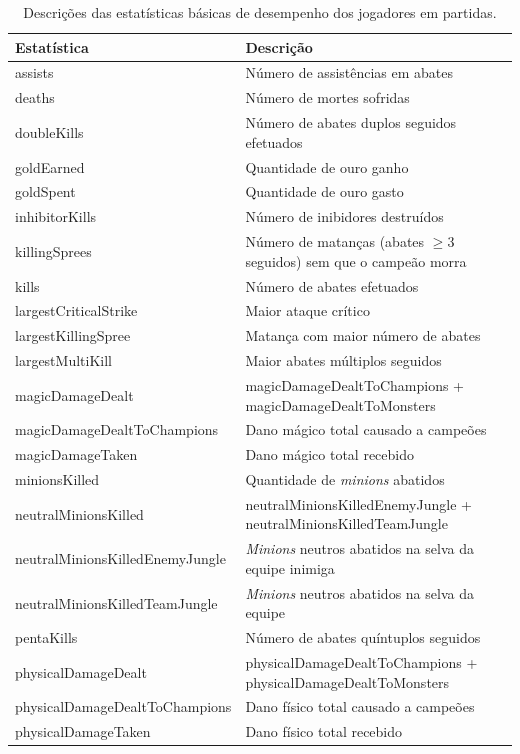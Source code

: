 \begin{table}
  \scriptsize
  \caption{Descrições das estatísticas básicas de desempenho dos jogadores em partidas.}
  \label{tab:features-desc}
  \begin{tabular}{p{}p{}}
    \toprule
    Estatística & Descrição \\
    \midrule
assists & Número de assistências em abates\\
deaths & Número de mortes sofridas \\
doubleKills & Número de abates duplos seguidos efetuados\\
goldEarned & Quantidade de ouro ganho\\
goldSpent & Quantidade de ouro gasto\\
inhibitorKills & Número de inibidores destruídos\\
killingSprees & Número de matanças (abates $\geq 3$ seguidos) sem que o campeão morra \\
kills & Número de abates efetuados\\
largestCriticalStrike & Maior ataque crítico\\
largestKillingSpree & Matança com maior número de abates\\
largestMultiKill & Maior abates múltiplos seguidos\\
magicDamageDealt & magicDamageDealtToChampions +  magicDamageDealtToMonsters\\
magicDamageDealtToChampions & Dano mágico total causado a campeões\\
magicDamageTaken & Dano mágico total recebido\\
minionsKilled & Quantidade de \textit{minions} abatidos\\
neutralMinionsKilled & neutralMinionsKilledEnemyJungle + neutralMinionsKilledTeamJungle\\
neutralMinionsKilledEnemyJungle & \textit{Minions} neutros abatidos na selva da equipe inimiga\\
neutralMinionsKilledTeamJungle & \textit{Minions} neutros abatidos na selva da equipe\\
pentaKills & Número de abates quíntuplos seguidos\\
physicalDamageDealt & physicalDamageDealtToChampions + physicalDamageDealtToMonsters\\
physicalDamageDealtToChampions & Dano físico total causado a campeões\\
physicalDamageTaken & Dano físico total recebido\\

\end{tabular}
\end{table}
